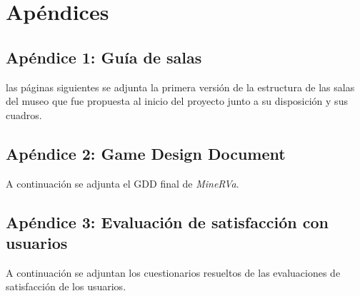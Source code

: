 \chapter{Apéndices}
\label{chap:apendices}

\section{Apéndice 1: Guía de salas}
\label{anexo:guia-salas}

 las páginas siguientes se adjunta la primera versión de la estructura de las salas del museo que fue propuesta al inicio del proyecto junto a su disposición y sus cuadros.



\section{Apéndice 2: Game Design Document}
\label{anexo:gdd}

A continuación se adjunta el \acs{GDD} final de \textit{MineRVa}.

\newpage



\section{Apéndice 3: Evaluación de satisfacción con usuarios}
\label{anexo:evaluacion-satisfaccion}

A continuación se adjuntan los cuestionarios resueltos de las evaluaciones de satisfacción de los usuarios.

\newpage


